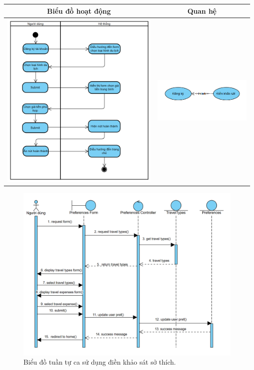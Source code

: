 \noindent 
\begin{tabular}{| c | c |}
    \hline
    \textbf{Biểu đồ hoạt động} & \textbf{Quan hệ} \\ 
    \hline
    \includegraphics[width=0.5\linewidth]{figures/c3/3-3-3-ad.png} 
    & 
    \includegraphics[width=0.45\linewidth]{figures/c3/3-3-3-rd.png} \\ 
    \hline
\end{tabular}



\begin{figure}[H]
    \centering  
    \includegraphics[width=1\textwidth]{figures/c3/3-3-3-sd.png}
    \caption{Biểu đồ tuần tự ca sử dụng điền khảo sát sở thích.}
    \label{fig:3-3-3-sequence-diagram}
\end{figure}